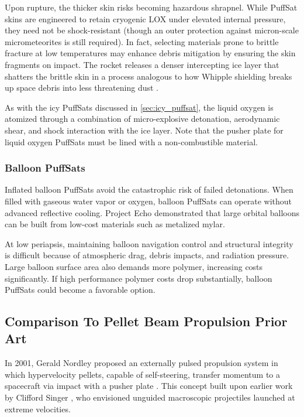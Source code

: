 \documentclass{article}
\begin{document}
Upon rupture, the thicker skin risks becoming hazardous shrapnel. While PuffSat skins are engineered to retain cryogenic LOX under elevated internal pressure, they need not be shock-resistant (though an outer protection against micron-scale micrometeorites is still required). In fact, selecting materials prone to brittle fracture at low temperatures may enhance debris mitigation by ensuring the skin fragments on impact. The rocket releases a denser intercepting ice layer that shatters the brittle skin in a process analogous to how Whipple shielding breaks up space debris into less threatening dust \cite{whipple_shield}.

As with the icy PuffSats discussed in \autoref{sec:icy_puffsat}, the liquid oxygen is atomized through a combination of micro-explosive detonation, aerodynamic shear, and shock interaction with the ice layer.  Note that the pusher plate for liquid oxygen PuffSats must be lined with a non-combustible material.

\subsubsection{Balloon PuffSats}
Inflated balloon PuffSats avoid the catastrophic risk of failed detonations.  When filled with gaseous water vapor or oxygen, balloon PuffSats can operate without advanced reflective cooling. Project Echo \cite{JPL_EchoQL2010} demonstrated that large orbital balloons can be built from low-cost materials such as metalized mylar.

At low periapsis, maintaining balloon navigation control and structural integrity is difficult because of  atmospheric drag, debris impacts, and radiation pressure. Large balloon surface area also demands more polymer, increasing costs significantly. If high performance polymer costs drop substantially, balloon PuffSats could become a favorable option.

\subsection{Comparison To Pellet Beam Propulsion Prior Art}
In 2001, Gerald Nordley proposed an externally pulsed propulsion system in which hypervelocity pellets, capable of self-steering, transfer momentum to a spacecraft via impact with a pusher plate \cite{nordley2001interstellar}. This concept built upon earlier work by Clifford Singer \cite{singer1979interstellar}, who envisioned unguided macroscopic projectiles launched at extreme velocities. 
\end{document}
